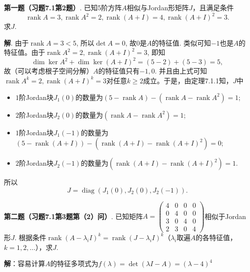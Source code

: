 
\renewcommand{\newpageorvspace}{\vspace{2em}}

\date{2022-4-8  第三次习题课}



\maketitle


{\bf 第一题（习题7.1第2题）}. 已知5阶方阵$A$相似与Jordan形矩阵$J$，且满足条件
$$\operatorname{rank}A = 3, \operatorname{rank}A^2 = 2, \operatorname{rank}(A+I) = 4, \operatorname{rank}(A+I)^2 = 3.$$
求$J$.

{\bf 解}. 由于$\operatorname{rank}A = 3 < 5$, 所以$\det A = 0$, 故$0$是$A$的特征值. 类似可知$-1$也是$A$的特征值。由于$\operatorname{rank}A^2 = 2, \operatorname{rank}(A+I)^2 = 3$, 即知
$$\dim \ker A^2 + \dim \ker (A+I)^2 = (5-2) + (5-3) = 5,$$
故（可以考虑根子空间分解）$A$的特征值只有$-1, 0$. 并且由上式可知$\operatorname{rank}A^k = 2, \operatorname{rank}(A+I)^k = 3$对任意$k\geqslant 2$成立。于是，由定理7.1.1知，$J$中
\begin{itemize}
\item $1$阶Jordan块$J_1(0)$的数量为$(5 - \operatorname{rank}A) - (\operatorname{rank}A - \operatorname{rank}A^2) = 1$;
\item $2$阶Jordan块$J_2(0)$的数量为$(\operatorname{rank}A - \operatorname{rank}A^2) = 1$;
\item $1$阶Jordan块$J_1(-1)$的数量为$(5 - \operatorname{rank}(A+I)) - (\operatorname{rank}(A+I) - \operatorname{rank}(A+I)^2) = 0$;
\item $2$阶Jordan块$J_2(-1)$的数量为$(\operatorname{rank}(A+I) - \operatorname{rank}(A+I)^2) = 1$.
\end{itemize}
所以
$$J = \operatorname{diag} (J_1(0), J_2(0), J_2(-1)).$$


\newpageorvspace


{\bf 第二题（习题7.1第3题第（2）问）}. 已知矩阵$A = \begin{pmatrix} 4 & 0 & 0 & 0 \\ 0 & 4 & 0 & 0 \\ 3 & 0 & 4 & 0 \\ 2 & 3 & 0 & 4 \end{pmatrix}$相似于Jordan形$J$. 根据条件$\operatorname{rank}(A - \lambda_i I)^k = \operatorname{rank}(J - \lambda_i I)^k$（$\lambda_i$取遍$A$的各特征值，$k=1,2,\ldots$），求$J$.

{\bf 解}：容易计算$A$的特征多项式为$f(\lambda) = \det (\lambda I - A) = (\lambda - 4)^4$


